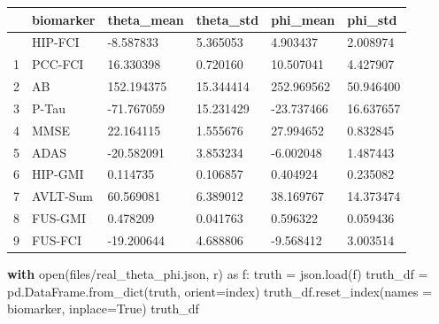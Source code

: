 \documentclass[
  letterpaper,
  DIV=11,
  numbers=noendperiod]{scrreprt}
\newenvironment{Shaded}{\begin{snugshade}}{\end{snugshade}}
\newcommand{\BuiltInTok}[1]{\textcolor[rgb]{0.00,0.23,0.31}{#1}}
\newcommand{\ControlFlowTok}[1]{\textcolor[rgb]{0.00,0.23,0.31}{\textbf{#1}}}
\newcommand{\ImportTok}[1]{\textcolor[rgb]{0.00,0.46,0.62}{#1}}
\newcommand{\NormalTok}[1]{\textcolor[rgb]{0.00,0.23,0.31}{#1}}
\newcommand{\OperatorTok}[1]{\textcolor[rgb]{0.37,0.37,0.37}{#1}}
\newcommand{\StringTok}[1]{\textcolor[rgb]{0.13,0.47,0.30}{#1}}
\newcommand{\VariableTok}[1]{\textcolor[rgb]{0.07,0.07,0.07}{#1}}
\begin{document}
\begin{longtable}[]{@{}llllll@{}}
\toprule\noalign{}
& biomarker & theta\_mean & theta\_std & phi\_mean & phi\_std \\
\midrule\noalign{}
\endhead
\bottomrule\noalign{}
\endlastfoot
0 & HIP-FCI & -8.587833 & 5.365053 & 4.903437 & 2.008974 \\
1 & PCC-FCI & 16.330398 & 0.720160 & 10.507041 & 4.427907 \\
2 & AB & 152.194375 & 15.344414 & 252.969562 & 50.946400 \\
3 & P-Tau & -71.767059 & 15.231429 & -23.737466 & 16.637657 \\
4 & MMSE & 22.164115 & 1.555676 & 27.994652 & 0.832845 \\
5 & ADAS & -20.582091 & 3.853234 & -6.002048 & 1.487443 \\
6 & HIP-GMI & 0.114735 & 0.106857 & 0.404924 & 0.235082 \\
7 & AVLT-Sum & 60.569081 & 6.389012 & 38.169767 & 14.373474 \\
8 & FUS-GMI & 0.478209 & 0.041763 & 0.596322 & 0.059436 \\
9 & FUS-FCI & -19.200644 & 4.688806 & -9.568412 & 3.003514 \\
\end{longtable}

\begin{Shaded}
\begin{Highlighting}[]
\ControlFlowTok{with} \BuiltInTok{open}\NormalTok{(}\StringTok{\textquotesingle{}files/real\_theta\_phi.json\textquotesingle{}}\NormalTok{, }\StringTok{\textquotesingle{}r\textquotesingle{}}\NormalTok{) }\ImportTok{as}\NormalTok{ f:}
\NormalTok{    truth }\OperatorTok{=}\NormalTok{ json.load(f)}
\NormalTok{truth\_df }\OperatorTok{=}\NormalTok{ pd.DataFrame.from\_dict(truth, orient}\OperatorTok{=}\StringTok{\textquotesingle{}index\textquotesingle{}}\NormalTok{)}
\NormalTok{truth\_df.reset\_index(names }\OperatorTok{=} \StringTok{\textquotesingle{}biomarker\textquotesingle{}}\NormalTok{, inplace}\OperatorTok{=}\VariableTok{True}\NormalTok{)}
\NormalTok{truth\_df}
\end{Highlighting}
\end{Shaded}
\end{document}

